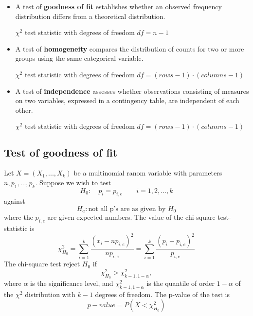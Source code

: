 \documentclass{article}
\begin{document}
\begin{itemize}
    \item A test of \textbf{goodness of fit} establishes whether an observed frequency 
    distribution differs from a theoretical distribution.

    $\chi^2$ test statistic with degrees of freedom $df=n-1$
    \item A test of \textbf{homogeneity} compares the distribution of counts for 
    two or more groups using the same categorical variable.

    $\chi^2$ test statistic with degrees of freedom $df=(rows-1)\cdot(columns-1)$
    \item A test of \textbf{independence} assesses whether observations consisting of 
    measures on two variables, expressed in a contingency table, are independent of each other.
    
    $\chi^2$ test statistic with degrees of freedom $df=(rows-1)\cdot(columns-1)$
\end{itemize}

\subsection{Test of goodness of fit}

Let $X=(X_1, ..., X_k)$ be a multinomial ranom variable with parameters
$n, p_1, ..., p_k$. Suppose we wish to test
\begin{equation}
    H_0: \quad p_i=p_{i,e} \qquad i =1,2,...,k
\end{equation}
against
\begin{equation}
    H_a: \mbox{not all p's are as given by } H_0
\end{equation}
where the $p_{i,e}$ are given expected numbers. The value of the chi-square test-statistic is
\begin{equation}
    \chi^2_{H_0} = \sum_{i=1}^k \frac{\left(x_i - np_{i,e}\right)^2}{np_{i,e}} = \sum_{i=1}^k \frac{\left(p_i - p_{i,e}\right)^2}{p_{i,e}}
\end{equation}
The chi-square test reject $H_0$ if
\begin{equation}
    \chi^2_{H_0} > \chi^2_{k-1,1-\alpha},
\end{equation}
where $\alpha$ is the significance level, and $\chi^2_{k-1,1-\alpha}$ is the 
quantile of order $1-\alpha$ of the $\chi^2$ distribution with $k-1$ degrees of
freedom.
The p-value of the test is
\begin{equation}
    p-value = P\left(X<\chi^2_{H_0}\right)
\end{equation}
\end{document}
